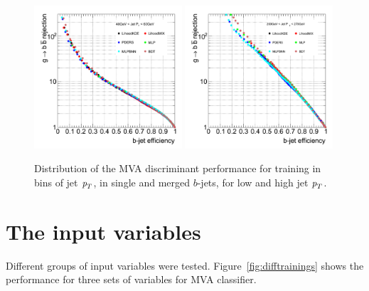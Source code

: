 \begin{figure}[tp]
\centering
\includegraphics[width=0.49\textwidth]{FIGS/TEMPFigs/MVA_differentMethods/bins/MVAs_RejvsEff40.pdf}
\includegraphics[width=0.49\textwidth]{FIGS/TEMPFigs/MVA_differentMethods/bins/MVAs_RejvsEff200.pdf}
\caption{Distribution of the MVA discriminant performance for training in bins of jet ${\emph{p}_{T}}$, in single and merged $b$-jets, for low and high jet ${\emph{p}_{T}}$.}
\label{fig:diffmethodsPerfBins}
\end{figure}

\section{The input variables}

Different groups of input variables were tested. Figure~\ref{fig:difftrainings} shows the performance for three sets of variables for MVA classifier.

